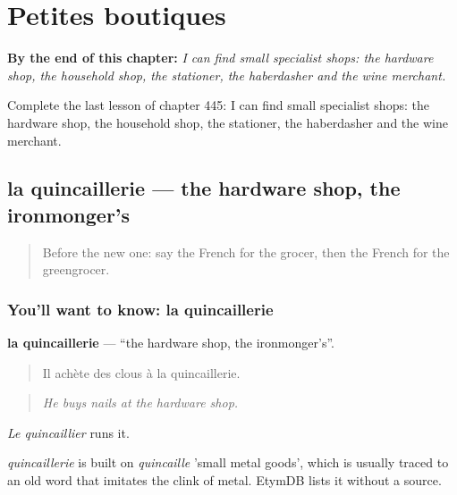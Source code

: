 
\chapter{Petites boutiques}
\label{ch:fr-petites-boutiques}

\begin{chapteropening}
\textbf{By the end of this chapter:} \emph{I can find small specialist shops: the hardware shop, the household shop, the stationer, the haberdasher and the wine merchant.}

Complete the last lesson of chapter 445: I can find small specialist shops: the hardware shop, the household shop, the stationer, the haberdasher and the wine merchant.
\end{chapteropening}

\section[la quincaillerie]{la quincaillerie — the hardware shop, the ironmonger’s}

\label{lesson:FR-C445-quincaillerie}



\begin{quote}
Before the new one: say the French for the grocer, then the French for the greengrocer.
\end{quote}

\subsection*{You'll want to know: la quincaillerie}
\textbf{la quincaillerie} — \textquotedblleft{}the hardware shop, the ironmonger’s\textquotedblright{}.

\begin{quote}
Il achète des clous à la quincaillerie.
\end{quote}

\begin{quote}
\emph{He buys nails at the hardware shop.}
\end{quote}

\emph{Le quincaillier} runs it.

\begin{cousinweb}
\emph{quincaillerie} is built on \emph{quincaille} 'small metal goods', which is usually traced to an old word that imitates the clink of metal. EtymDB lists it without a source.
\end{cousinweb}

